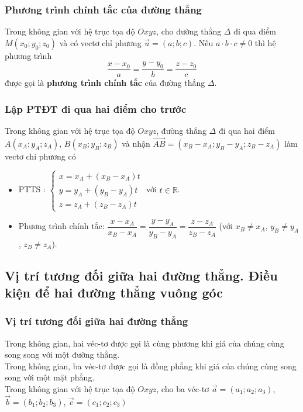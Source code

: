 \subsubsection{Phương trình chính tắc của đường thẳng}

 Trong không gian với hệ trục tọa độ $Oxyz$, cho đường thẳng $\Delta $ đi qua điểm $M(x_{0} ;y_{0} ;z_{0} )$ và có vectơ chỉ phương $\overrightarrow{u}=(a;b;c)$. Nếu $a\cdot b\cdot c\ne 0$ thì hệ phương trình $$\dfrac{x-x_{0} }{a} =\dfrac{y-y_{0} }{b} =\dfrac{z-z_{0} }{c} $$ được gọi là \textbf{phương trình chính tắc} của đường thẳng $\Delta $.


\subsubsection{Lập PTĐT đi qua hai điểm cho trước}

 Trong không gian với hệ trục tọa độ $Oxyz$, đường thẳng $\Delta $ đi qua hai điểm $A(x_{A} ;y_{A} ;z_{A} )$, $B(x_{B} ;y_{B} ;z_{B} )$ và nhận $\overrightarrow{AB}=(x_{B} -x_{A} ;y_{B} -y_{A} ;z_{B} -z_{A} )$ làm vectơ chỉ phương có
\begin{itemize}
	\item  PTTS : $\left\{\begin{array}{l} {x=x_{A} +(x_{B} -x_{A} )t} \\ {y=y_{A} +(y_{B} -y_{A} )t} \\ {z=z_{A} +(z_{B} -z_{A} )t} \end{array}\right. $ với $t\in  \mathbb{R}$.
	\item  Phương trình chính tắc: $\dfrac{x-x_{A} }{x_{B} -x_{A} } =\dfrac{y-y_{A} }{y_{B} -y_{A} } =\dfrac{z-z_{A} }{z_{B} -z_{A} } $ (với $x_{B} \ne x_{A}$, $y_{B} \ne y_{A}$, $z_{B} \ne z_{A} $).
\end{itemize}

 \subsection{Vị trí tương đối giữa hai đường thẳng. Điều kiện để hai đường thẳng vuông góc}
\subsubsection{Vị trí tương đối giữa hai đường thẳng}

 Trong không gian, hai véc-tơ được gọi là cùng phương khi giá của chúng cùng song song với một đường thẳng.\\
 Trong không gian, ba véc-tơ được gọi là đồng phẳng khi giá của chúng cùng song song với một mặt phẳng.\\
 Trong không gian với hệ trục tọa độ $Oxyz$, cho ba véc-tơ $\overrightarrow{a}=(a_{1} ;a_{2} ;a_{3} )$, $\overrightarrow{b}=(b_{1} ;b_{2} ;b_{3} )$, $\overrightarrow{c}=(c_{1} ;c_{2} ;c_{3} )$

